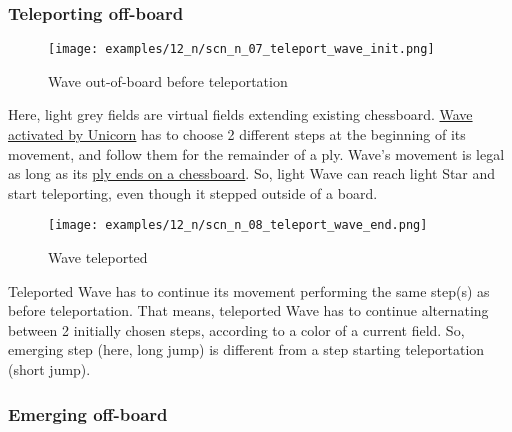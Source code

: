\subsubsection*{Teleporting off-board}
\label{sec:Nineteen/Star/Teleporting pieces/Teleporting off-board}

\vspace*{-1.3\baselineskip}
\noindent
\begin{figure}[!h]
\texttt{[image: examples/12\_n/scn\_n\_07\_teleport\_wave\_init.png]}
\caption{Wave out-of-board before teleportation}
\label{fig:scn_n_07_teleport_wave_init}
\end{figure}

Here, light grey fields are virtual fields extending existing chessboard.
\hyperref[fig:scn_mv_27_wave_activation_by_unicorn_first_step]{Wave activated by Unicorn}
has to choose 2 different steps at the beginning of its movement, and follow
them for the remainder of a ply. Wave's movement is legal as long as its
\hyperref[fig:scn_mv_30_wave_off_board]{ply ends on a chessboard}. So, light
Wave can reach light Star and start teleporting, even though it stepped
outside of a board.

\clearpage %

\vspace*{-2.0\baselineskip}
\noindent
\begin{figure}[!h]
\texttt{[image: examples/12\_n/scn\_n\_08\_teleport\_wave\_end.png]}
\caption{Wave teleported}
\label{fig:scn_n_08_teleport_wave_end}
\end{figure}

Teleported Wave has to continue its movement performing the same step(s) as
before teleportation. That means, teleported Wave has to continue alternating
between 2 initially chosen steps, according to a color of a current field. So,
emerging step (here, long jump) is different from a step starting teleportation
(short jump).

\clearpage %

\subsubsection*{Emerging off-board}
\label{sec:Nineteen/Star/Teleporting pieces/Emerging off-board}

